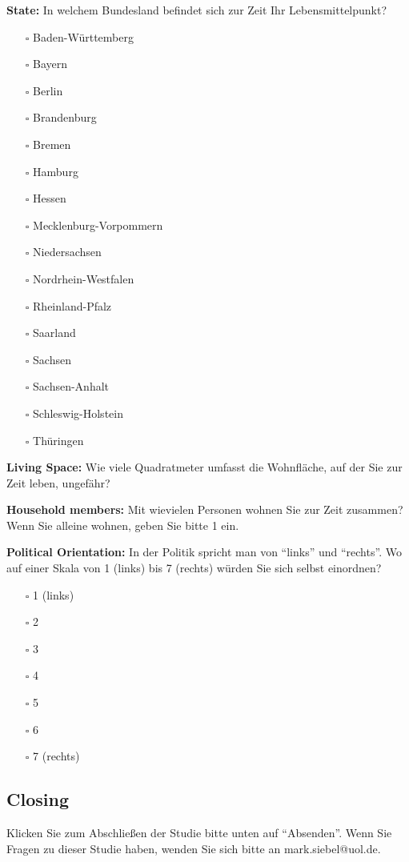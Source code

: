 \documentclass[egregdoesnotlikesansseriftitles]{scrartcl}
\begin{document}
\vspace{1em}
\noindent\textbf{State:} In welchem Bundesland befindet sich zur Zeit Ihr Lebensmittelpunkt?
\begin{itemize}
   \item[$\square$] Baden-Württemberg
   \item[$\square$] Bayern
   \item[$\square$] Berlin
   \item[$\square$] Brandenburg
   \item[$\square$] Bremen
   \item[$\square$] Hamburg
   \item[$\square$] Hessen
   \item[$\square$] Mecklenburg-Vorpommern
   \item[$\square$] Niedersachsen
   \item[$\square$] Nordrhein-Westfalen
   \item[$\square$] Rheinland-Pfalz
   \item[$\square$] Saarland
   \item[$\square$] Sachsen
   \item[$\square$] Sachsen-Anhalt
   \item[$\square$] Schleswig-Holstein
   \item[$\square$] Thüringen
\end{itemize}

\vspace{1em}
\noindent\textbf{Living Space:} Wie viele Quadratmeter umfasst die Wohnfläche, auf der Sie zur Zeit leben, ungefähr?

\vspace{1em}
\noindent\textbf{Household members:} Mit wievielen Personen wohnen Sie zur Zeit zusammen? Wenn Sie alleine wohnen, geben Sie bitte 1 ein.

\vspace{1em}
\noindent\textbf{Political Orientation:} In der Politik spricht man von \enquote{links} und \enquote{rechts}. Wo auf einer Skala von 1 (links) bis 7 (rechts) würden Sie sich selbst einordnen?
\begin{itemize}
   \item[$\square$] 1 (links)
   \item[$\square$] 2
   \item[$\square$] 3
   \item[$\square$] 4
   \item[$\square$] 5
   \item[$\square$] 6
   \item[$\square$] 7 (rechts)
\end{itemize}


\subsection*{Closing}
Klicken Sie zum Abschließen der Studie bitte unten auf \enquote{Absenden}. Wenn Sie Fragen zu dieser Studie haben, wenden Sie sich bitte an mark.siebel@uol.de.
\end{document}
